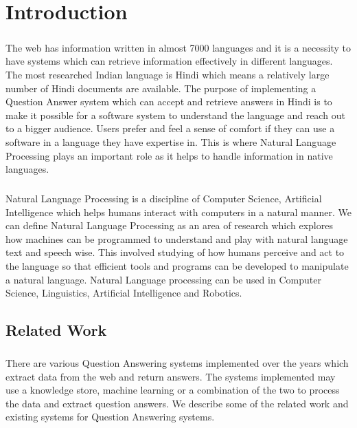 \chapter{Introduction}

\paragraph{}
The web has information written in almost 7000 languages and it is a necessity to have systems which can retrieve information effectively in different languages. The most researched Indian language is Hindi which means a relatively large number of Hindi documents are available. The purpose of implementing a Question Answer system which can accept and retrieve answers in Hindi is to make it possible for a software system to understand the language and reach out to a bigger audience. Users prefer and feel a sense of comfort if they can use a software in a language they have expertise in. This is where Natural Language Processing \cite{chowdhury2003natural} plays an important role as it helps to handle information in native languages.

\paragraph{}
Natural Language Processing is a discipline of Computer Science, Artificial Intelligence which helps humans interact with computers in a natural manner. We can define Natural Language Processing as an area of research which explores how machines can be programmed to understand and play with natural language text and speech wise. This involved studying of how humans perceive and act to the language so that efficient tools and programs can be developed to manipulate a natural language. Natural Language processing can be used in Computer Science, Linguistics, Artificial Intelligence and Robotics. 

\section{Related Work}
\paragraph{}
There are various Question Answering systems implemented over the years which extract data from the web and return answers. The systems implemented may use a knowledge store, machine learning or a combination of the two to process the data and extract question answers. We describe some of the related work and existing systems for Question Answering systems.

